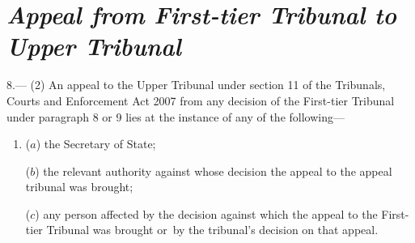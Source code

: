 \documentclass[12pt,a4paper]{article}
\begin{document}

\section*{\itshape Appeal from 
First-tier Tribunal to Upper Tribunal  %
}

8.---%
%
(2) An appeal 
to the Upper Tribunal under section 11 of the Tribunals, Courts and Enforcement Act 2007 from any decision of the First-tier Tribunal under paragraph 8 or 9 lies  %
at the instance of any of the following—
\begin{enumerate}\item[]
($a$) the Secretary of State;

($b$) the relevant authority against whose decision the appeal to the appeal tribunal was brought;

($c$) any person affected by the decision against which the appeal to the 
First-tier Tribunal  %
was brought or~by the tribunal’s decision on that appeal.
\end{enumerate}
\end{document}
